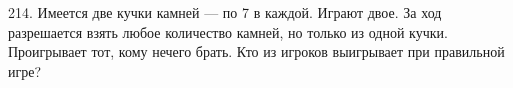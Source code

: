 214. Имеется две кучки камней --- по 7 в каждой. Играют двое. За ход разрешается взять любое количество камней, но только из одной кучки. Проигрывает тот, кому нечего брать. Кто из игроков выигрывает при правильной игре?\\
